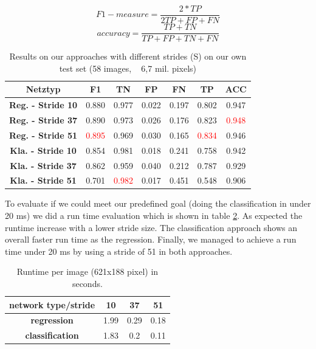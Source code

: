 \begin{equation} \label{eq:fMeasure}
F1-measure = \frac{2*TP}{2TP +FP +FN}
\end{equation}
\begin{equation} \label{eq:accuracy}
accuracy = \frac{TP + TN}{TP + FP + TN + FN}
\end{equation}

\begin{table}[h!]
  \begin{center}
    \label{tab:ownapproach}
    \begin{tabular}{c|cccccc}
    \toprule
      \textbf{Netztyp} & {\bf F1} & \textbf{TN} & \textbf{FP} & \textbf{FN} & \textbf{TP} & \textbf{ACC} \\
       \midrule
      \textbf{Reg. - Stride 10} & 0.880 & 0.977 & 0.022 & 0.197 & 0.802 & 0.947\\
      \textbf{Reg. - Stride 37} & 0.890 & 0.973 & 0.026 & 0.176 & 0.823 &  \textcolor{red}{0.948}\\ 
      \textbf{Reg. - Stride 51} & \textcolor{red}{0.895} & 0.969 & 0.030 & 0.165 & \textcolor{red}{0.834} & 0.946\\
      \midrule
      \textbf{Kla. - Stride 10} & 0.854 & 0.981 & 0.018 & 0.241 & 0.758 & 0.942\\
      \textbf{Kla. - Stride 37} & 0.862 & 0.959 & 0.040 & 0.212 & 0.787 & 0.929\\
      \textbf{Kla. - Stride 51} & 0.701 & \textcolor{red}{0.982} & 0.017 & 0.451 & 0.548 & 0.906\\
      \bottomrule
    \end{tabular}
    \caption{Results on our approaches with different strides (S) on our own test set (58 images, ~ 6,7 mil. pixels)}
  \end{center}
\end{table}

To evaluate if we could meet our predefined goal (doing the classification in under 20 ms) we did a run time evaluation which is shown in table \ref{tab:runtime}. As expected the runtime increase with a lower stride size. The classification approach shows an overall faster run time as the regression. Finally, we managed to achieve a run time under 20 ms by using a stride of 51 in both approaches.



 \begin{table}[h!]
  \begin{center}
  \label{tab:runtime}
    \begin{tabular}{c|ccc}
    \toprule
      \textbf{network type/stride} & \textbf{10} & \textbf{37} & \textbf{51} \\
     \midrule
      \textbf{regression} & 1.99 & 0.29 & 0.18 \\
      \textbf{classification} & 1.83 & 0.2 & 0.11\\
      \bottomrule
    \end{tabular}
        \caption{Runtime per image (621x188 pixel) in seconds.}
  \end{center}
\end{table}


